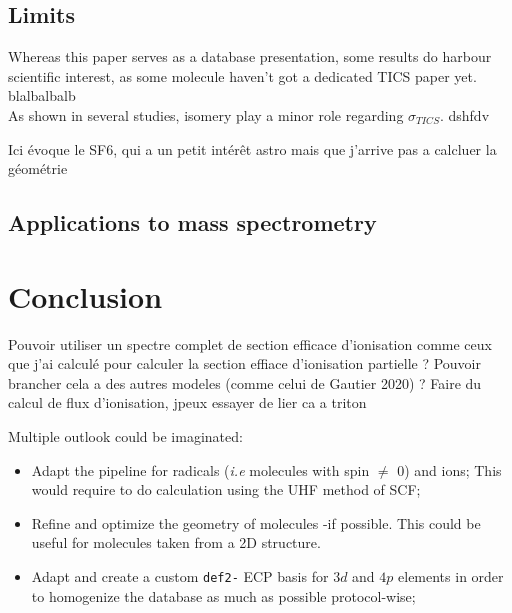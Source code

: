 \documentclass[twocolumn, a4paper, twoside,10pt]{scrartcl}
\begin{document}
\subsection{Limits}
Whereas this paper serves as a database presentation, some results do harbour scientific interest, as some molecule haven't got a dedicated TICS paper yet. blalbalbalb\\
As shown in several studies, isomery play a minor role regarding $\sigma_{TICS}$. dshfdv

Ici évoque le SF6, qui a un petit intérêt astro mais que j'arrive pas a calcluer la géométrie


\subsection{Applications to mass spectrometry}

\section{Conclusion}

Pouvoir utiliser un spectre complet de section efficace d'ionisation comme ceux que j'ai calculé pour calculer la section effiace d'ionisation partielle ? Pouvoir brancher cela a des autres modeles (comme celui de Gautier 2020) ? Faire du calcul de flux d'ionisation, jpeux essayer de lier ca a triton

Multiple outlook could be imaginated:
\begin{itemize}
    \item Adapt the pipeline for radicals (\textit{i.e} molecules with spin $\neq$ 0) and ions; This would require to do calculation using the UHF method of SCF;
    \item Refine and optimize the geometry of molecules -if possible. This could be useful for molecules taken from a 2D structure.
    \item Adapt and create a custom \verb|def2-| ECP basis for $3d$ and $4p$ elements in order to homogenize the database as much as possible protocol-wise;
\end{itemize}
\end{document}
